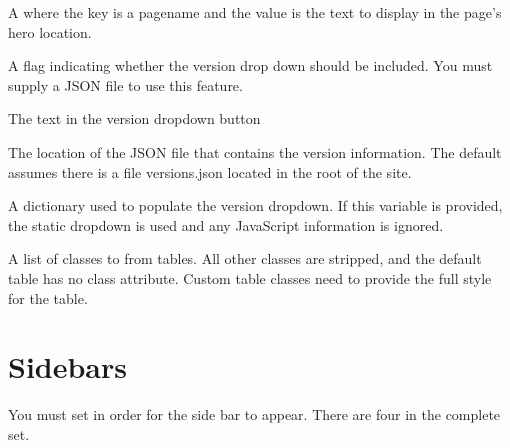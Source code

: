 \documentclass[letterpaper,10pt,english]{sphinxmanual}
\begin{document}
\begin{description}
\begin{itemize}
\end{itemize}

\item[{\sphinxcode{\sphinxupquote{heroes}}}] \leavevmode
A  where the key is a pagename and the value is the text to display in the
page’s hero location.

\item[{\sphinxcode{\sphinxupquote{version\_dropdown}}}] \leavevmode
A flag indicating whether the version drop down should be included. You must supply a JSON file
to use this feature.

\item[{\sphinxcode{\sphinxupquote{version\_dropdown\_text}}}] \leavevmode
The text in the version dropdown button

\item[{\sphinxcode{\sphinxupquote{version\_json}}}] \leavevmode
The location of the JSON file that contains the version information. The default assumes there
is a file versions.json located in the root of the site.

\item[{\sphinxcode{\sphinxupquote{version\_info}}}] \leavevmode
A dictionary used to populate the version dropdown.  If this variable is provided, the static
dropdown is used and any JavaScript information is ignored.

\item[{\sphinxcode{\sphinxupquote{table\_classes}}}] \leavevmode
A list of classes to  from tables. All other classes are stripped, and the default
table has no class attribute. Custom table classes need to provide the full style for the table.

\end{description}


\section{Sidebars}
\label{\detokenize{customization:sidebars}}
You must set  in order for the side bar to appear. There are
four in the complete set.

\begin{sphinxVerbatim}[commandchars=\\\{\}]
  
     \PYG{p}{[}   \PYG{p}{]}
\end{sphinxVerbatim}
\end{document}
